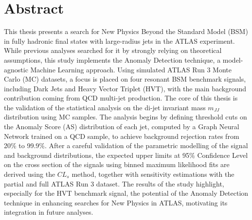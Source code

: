 \chapter*{Abstract}

This thesis presents a search for New Physics Beyond the Standard Model (BSM) in fully hadronic final states with large-radius jets in the ATLAS experiment. 
While previous analyses searched for it by strongly relying on theoretical assumptions, this study implements the Anomaly Detection technique, a model-agnostic Machine Learning approach.
Using simulated ATLAS Run 3 Monte Carlo (MC) datasets, a focus is placed on four resonant BSM benchmark signals, including Dark Jets and Heavy Vector Triplet (HVT), with the main background contribution coming from QCD multi-jet production.
The core of this thesis is the validation of the statistical analysis on the di-jet invariant mass $m_{JJ}$ distribution using MC samples.
The analysis begins by defining threshold cuts on the Anomaly Score (AS) distribution of each jet, computed by a Graph Neural Network trained on a QCD sample, to achieve background rejection rates from 20\% to 99.9\%. 
After a careful validation of the parametric modelling of the signal and background distributions, the expected upper limits at 95\% Confidence Level on the cross section of the signals using binned maximum likelihood fits are derived using the $CL_s$ method, together with sensitivity estimations with the partial and full ATLAS Run 3 dataset.
The results of the study highlight, especially for the HVT benchmark signal, the potential of the Anomaly Detection technique in enhancing searches for New Physics in ATLAS, motivating its integration in future analyses.

